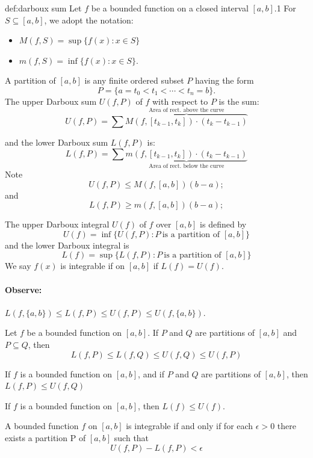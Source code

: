 \documentclass{notes}
\begin{document}
\begin{definition}{def:darboux sum}
Let $f$ be a bounded function on a closed interval $[a, b]$.1 For $S \subseteq[a, b]$,
we adopt the notation:
\begin{itemize}
	\item 
	$M(f, S) = \sup\{f(x) : x \in S\}$
	\item 
	$m(f, S) = \inf\{f(x) : x \in S\}$.
\end{itemize}
A partition of $[a, b]$ is any finite ordered subset $P$ having the form
$$P = \{a = t_0 < t_1 < \cdots< t_n = b\}.$$
	The upper Darboux sum $U(f, P)$ of $f$ with respect to $P$ is the sum:
	$$U(f,P) = \sum \overbrace{M(f, [t_{k - 1}, t_k])\cdot (t_k - t_{k- 1})}^{\text{Area of rect. above the curve} }$$
	
	and the lower Darboux sum $L(f, P)$ is:
		$$L(f,P) = \sum \underbrace{m(f, [t_{k- 1}, t_k])\cdot (t_k - t_{k- 1})}_{\text{Area of rect. below the curve}}$$
		Note
		$$U(f,P) \leq M(f,[a,b])(b-a); $$
		and 
		$$ L(f,P) \geq m(f,[a,b])(b-a) ; $$
		
		The upper Darboux integral $U(f)$ of $f$ over $[a,b]$ is defined by
		$$ U(f) =  \inf \{U(f,P):P\ \text{is a partition of }[a,b]\}$$
		and the lower Darboux integral is
		$$L(f) = \sup\{L(f,P):P\ \text{is a partition of }[a,b]\}$$
		We say $f(x)$ is integrable if on $[a,b]$ if $L(f)=U(f)$.
\end{definition}
\paragraph{Observe:}

$L(f,\{a,b\})\leq L(f,P) \leq U(f,P)\leq U(f,\{a,b\})$. 


\begin{lemma}{}
	Let $f$ be a bounded function on $[a, b]$. If $P$ and $ Q$ are partitions of
	$[a, b]$ and $ P \subseteq Q$, then
	$$L(f,P)\leq L(f,Q)\leq U(f,Q)\leq U(f,P)$$
\end{lemma}
 \begin{lemma}{}
 	If $f$ is a bounded function on $[a, b]$, and if $P$ and $Q$ are partitions of
 	$[a, b]$, then $L(f, P) \leq U(f, Q)$
 \end{lemma}

\begin{lemma}{}
If $f$ is a bounded function on $[a, b]$, then $L(f) \leq U(f)$.
\end{lemma}
\begin{theorem}{}
	A bounded function $f$ on $[a, b]$ is integrable if and only if for each
	$\epsilon > 0$ there exists a partition P of $[a, b]$ such that
	$$U(f,P)-L(f,P) < \epsilon$$
\end{theorem}
\end{document}
